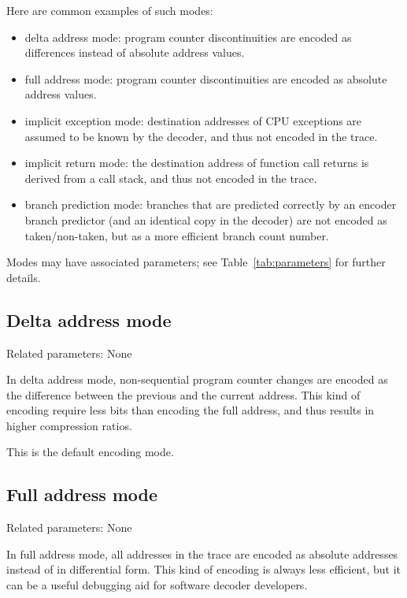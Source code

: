 Here are common examples of such modes:

\begin{itemize}
  \item delta address mode:
    program counter discontinuities are encoded as differences instead of absolute address values.
  \item full address mode:
    program counter discontinuities are encoded as absolute address values.
  \item implicit exception mode:
    destination addresses of CPU exceptions are assumed to be known by the decoder, and thus not encoded
    in the trace.
  \item implicit return mode:
    the destination address of function call returns is derived from a call stack, and thus not encoded
    in the trace.
  \item branch prediction mode:
    branches that are predicted correctly by an encoder branch predictor (and an identical copy in the decoder)
    are not encoded as taken/non-taken, but as a more efficient branch count number.
\end{itemize}

Modes may have associated parameters; see Table~\ref{tab:parameters} for further details.

\subsection{Delta address mode} \label{sec:delta-address}

Related parameters: None

In delta address mode, non-sequential program counter changes
are encoded as the difference between the previous and the current
address. This kind of encoding require less bits than encoding the
full address, and thus results in higher compression ratios.

This is the default encoding mode.

\subsection{Full address mode} \label{sec:full-address}

Related parameters: None

In full address mode, all addresses in the trace are encoded as absolute addresses instead
of in differential form. This kind of encoding is always less efficient, but it can be a useful 
debugging aid for software decoder developers.

